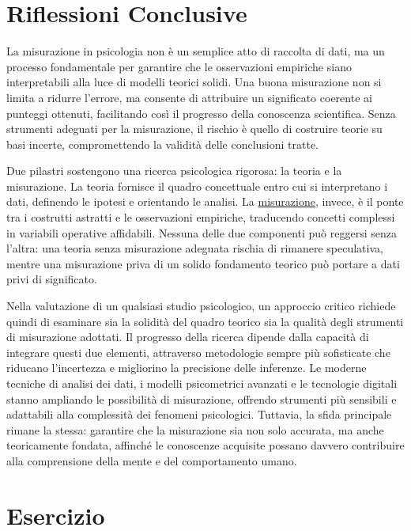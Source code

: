 \documentclass[
  letterpaper,
]{krantz}
\begin{document}
\section{Riflessioni Conclusive}\label{riflessioni-conclusive-2}

La misurazione in psicologia non è un semplice atto di raccolta di dati,
ma un processo fondamentale per garantire che le osservazioni empiriche
siano interpretabili alla luce di modelli teorici solidi. Una buona
misurazione non si limita a ridurre l'errore, ma consente di attribuire
un significato coerente ai punteggi ottenuti, facilitando così il
progresso della conoscenza scientifica. Senza strumenti adeguati per la
misurazione, il rischio è quello di costruire teorie su basi incerte,
compromettendo la validità delle conclusioni tratte.

Due pilastri sostengono una ricerca psicologica rigorosa: la teoria e la
misurazione. La teoria fornisce il quadro concettuale entro cui si
interpretano i dati, definendo le ipotesi e orientando le analisi. La
\href{https://statmodeling.stat.columbia.edu/2015/04/28/whats-important-thing-statistics-thats-not-textbooks/}{misurazione},
invece, è il ponte tra i costrutti astratti e le osservazioni empiriche,
traducendo concetti complessi in variabili operative affidabili. Nessuna
delle due componenti può reggersi senza l'altra: una teoria senza
misurazione adeguata rischia di rimanere speculativa, mentre una
misurazione priva di un solido fondamento teorico può portare a dati
privi di significato.

Nella valutazione di un qualsiasi studio psicologico, un approccio
critico richiede quindi di esaminare sia la solidità del quadro teorico
sia la qualità degli strumenti di misurazione adottati. Il progresso
della ricerca dipende dalla capacità di integrare questi due elementi,
attraverso metodologie sempre più sofisticate che riducano l'incertezza
e migliorino la precisione delle inferenze. Le moderne tecniche di
analisi dei dati, i modelli psicometrici avanzati e le tecnologie
digitali stanno ampliando le possibilità di misurazione, offrendo
strumenti più sensibili e adattabili alla complessità dei fenomeni
psicologici. Tuttavia, la sfida principale rimane la stessa: garantire
che la misurazione sia non solo accurata, ma anche teoricamente fondata,
affinché le conoscenze acquisite possano davvero contribuire alla
comprensione della mente e del comportamento umano.

\section*{Esercizio}\label{esercizio}
\end{document}
